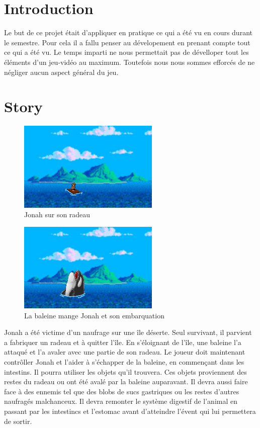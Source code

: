 \documentclass{prologArticle}
\begin{document}
\buildtitle



\section{Introduction}
Le but de ce projet était d'appliquer en pratique ce qui a été vu en cours durant le semestre. Pour cela il a fallu penser au dévelopement en prenant compte tout ce qui a été vu. Le temps imparti ne nous permettait pas de dévelloper tout les éléments d'un jeu-vidéo au maximum. Toutefois nous nous sommes efforcés de ne négliger aucun aspect général du jeu.

\section{Story}

\begin{figure}[H]
    \centering
    \includegraphics[width=0.6\textwidth]{res/story1.png}
    \caption{Jonah sur son radeau}
\end{figure}

\begin{figure}[H]
    \centering
    \includegraphics[width=0.6\textwidth]{res/story2.png}
    \caption{La baleine mange Jonah et son embarquation}
\end{figure}

Jonah a été victime d'un naufrage sur une île déserte. Seul survivant, il parvient a fabriquer un radeau et à quitter l'île. En s'éloignant de l'île, une baleine l'a attaqué et l'a avaler avec une partie de son radeau. Le joueur doit maintenant contrôller Jonah et l'aider à s'échapper de la baleine, en commençant dans les intestins. Il pourra utiliser les objets qu'il trouvera. Ces objets proviennent des restes du radeau ou ont été avalé par la baleine auparavant. Il devra aussi faire face à des ennemis tel que des blobs de sucs gastriques ou les restes d'autres naufragés malchanceux. Il devra remonter le système digestif de l'animal en passant par les intestincs et l'estomac avant d'atteindre l'évent qui lui permettera de sortir.
\end{document}
